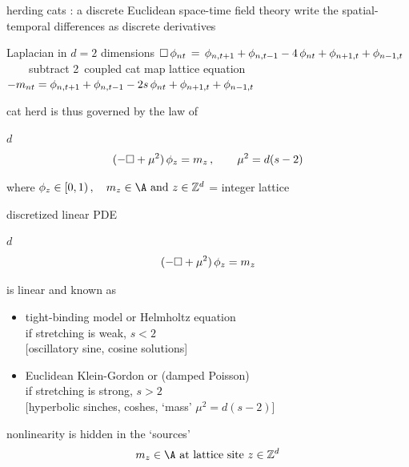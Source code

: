 \begin{frame}{herding cats : a discrete Euclidean space-time field theory}
write the spatial-temporal differences as discrete derivatives
\begin{block}{Laplacian in %
              $d=2$ dimensions}
\(
\Box\,\phi_{nt} \,=\, \phi_{n,t+1} + \phi_{n,t-1}
- 4 \, \phi_{nt} + \phi_{n+1,t} + \phi_{n-1, t}
\)\\
~~~~{\scriptsize subtract 2\dmn\ coupled cat map lattice equation}\\
\(
-{m_{n t}}
 =
\phi_{n,t+1} + \phi_{n,t-1} - 2s \, \phi_{n t} + \phi_{n+1,t} + \phi_{n-1, t}
\) %
\end{block}

\bigskip

{\color{blue}cat herd} is thus governed by the law of
\begin{block}{$d$\dmn\ \catlatt}
\[
 (-\Box + {\mu}^2)\,\phi_{z} = m_z
\,, \qquad
{\mu}^2= d(s-2)
\] %

\medskip

\end{block}

\bigskip

where
\(
  \ssp_{z} \in [0,1)
    \,, \quad
  \Ssym{z} \in \A
    \mbox{  and  }
  z\in \integers^{d}
\) = integer lattice
\end{frame} %

\begin{frame}{discretized linear PDE}
\begin{block}{$d$\dmn\ \catlatt}
{\Large
\[
 (-\Box + {\mu}^2)\,\phi_{z} = m_z
\] %
}
\end{block}

\bigskip

is linear and known as
\begin{itemize}
\item {\color{blue}tight-binding} model or {\color{blue}Helmholtz} equation \\
if stretching is weak, $s<2$ \\
 $[$oscillatory sine, cosine solutions]
\item
Euclidean {\color{blue}Klein-Gordon} or (damped {\color{blue}Poisson})\\
if stretching is strong, $s>2$ \\
 $[$hyperbolic sinches, coshes, `{\color{blue}mass}' ${\mu}^2=d(s-2)$]
\end{itemize}
\medskip

nonlinearity is hidden in the `sources'
\[
  \Ssym{z} \in \A
    \mbox{  at lattice site  }
  z\in \integers^{d}
\]
\end{frame} %

